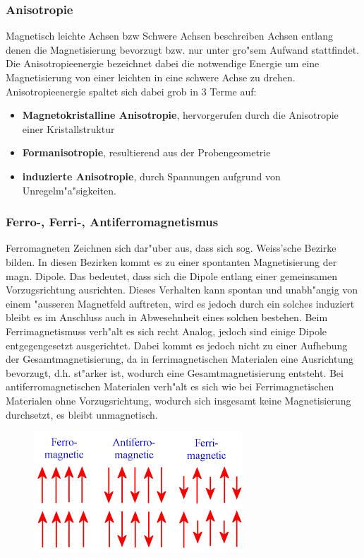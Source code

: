         \subsubsection*{Anisotropie}
            Magnetisch leichte Achsen bzw Schwere Achsen beschreiben Achsen entlang denen die Magnetisierung bevorzugt
            bzw. nur unter gro"sem Aufwand stattfindet. Die Anisotropieenergie bezeichnet dabei die notwendige Energie
            um eine Magnetisierung von einer leichten in eine schwere Achse zu drehen.\\
            Anisotropieenergie spaltet sich dabei grob in 3 Terme auf:
            \begin{itemize}
                \item \textbf{Magnetokristalline Anisotropie}, hervorgerufen durch die Anisotropie einer Kristallstruktur
                \item \textbf{Formanisotropie}, resultierend aus der Probengeometrie
                \item \textbf{induzierte Anisotropie}, durch Spannungen aufgrund von Unregelm"a"sigkeiten.
            \end{itemize}
        \subsubsection*{Ferro-, Ferri-, Antiferromagnetismus}
            Ferromagneten Zeichnen sich dar"uber aus, dass sich sog. Weiss'sche Bezirke bilden. In diesen Bezirken
            kommt es zu einer spontanten Magnetisierung der magn. Dipole. Das bedeutet, dass sich die Dipole entlang einer
            gemeinsamen Vorzugsrichtung ausrichten. Dieses Verhalten kann spontan und unabh"angig von einem "ausseren Magnetfeld
            auftreten, wird es jedoch durch ein solches induziert bleibt es im Anschluss auch in Abwesehnheit eines solchen bestehen.
            Beim Ferrimagnetismuss verh"alt es sich recht Analog, jedoch sind einige Dipole entgegengesetzt ausgerichtet.
            Dabei kommt es jedoch nicht zu einer Aufhebung der Gesamtmagnetisierung, da in ferrimagnetischen Materialen
            eine Ausrichtung bevorzugt, d.h. st"arker ist, wodurch eine Gesamtmagnetisierung entsteht.
            Bei antiferromagnetischen Materialen verh"alt es sich wie bei Ferrimagnetischen Materialen ohne Vorzugsrichtung,
            wodurch sich insgesamt keine Magnetisierung durchsetzt, es bleibt unmagnetisch.
            \begin{figure}[H]
                \centering
                \includegraphics{Images/ferroferrianti.png}
            \end{figure}
